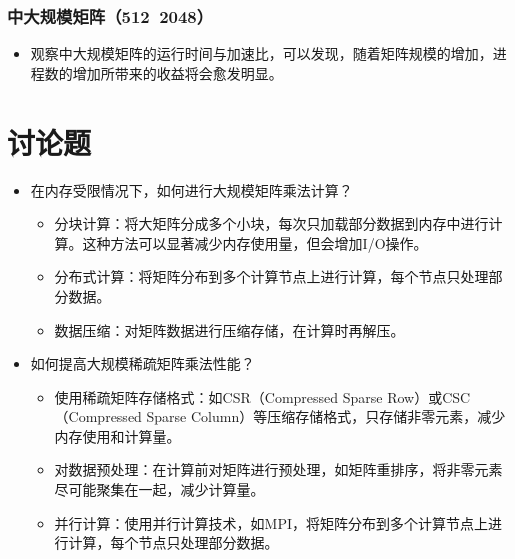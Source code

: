 \documentclass{SYSUReport}
\begin{document}
\subsubsection{中大规模矩阵（512~2048）}
\begin{itemize}
    \item 观察中大规模矩阵的运行时间与加速比，可以发现，随着矩阵规模的增加，进程数的增加所带来的收益将会愈发明显。
\end{itemize}

\section{讨论题}
\begin{itemize}
    \item 在内存受限情况下，如何进行大规模矩阵乘法计算？

    \begin{itemize}
        \item 分块计算：将大矩阵分成多个小块，每次只加载部分数据到内存中进行计算。这种方法可以显著减少内存使用量，但会增加I/O操作。
        \item 分布式计算：将矩阵分布到多个计算节点上进行计算，每个节点只处理部分数据。
        \item 数据压缩：对矩阵数据进行压缩存储，在计算时再解压。
    \end{itemize}

    
    \item 如何提高大规模稀疏矩阵乘法性能？

    \begin{itemize}
        \item 使用稀疏矩阵存储格式：如CSR（Compressed Sparse Row）或CSC（Compressed Sparse Column）等压缩存储格式，只存储非零元素，减少内存使用和计算量。
        \item 对数据预处理：在计算前对矩阵进行预处理，如矩阵重排序，将非零元素尽可能聚集在一起，减少计算量。
        \item 并行计算：使用并行计算技术，如MPI，将矩阵分布到多个计算节点上进行计算，每个节点只处理部分数据。
    \end{itemize}

\end{itemize}
\end{document}
